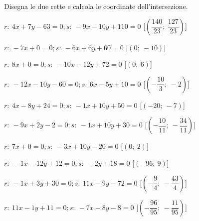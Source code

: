 \begin{esercizio}\label{ese:}
 Disegna le due rette e calcola le coordinate dell'intersezione.
 \begin{enumeratea}
  \item  \(r:~4 x + 7 y - 63 = 0; s:~-9 x - 10 y + 110 = 0\) \hfill 
   [\(\left(\dfrac{140}{23};~\dfrac{127}{23}\right)\)]
  \item  \(r:~-7 x + 0 = 0; s:~-6 x + 6 y + 60 = 0\) \hfill 
   [\(\left(0;~-10\right)\)]
  \item  \(r:~8 x + 0 = 0; s:~-10 x - 12 y + 72 = 0\) \hfill 
   [\(\left(0;~6\right)\)]
  \item  \(r:~-12 x - 10 y - 60 = 0; s:~6 x - 5 y + 10 = 0\) \hfill 
   [\(\left(-\dfrac{10}{3};~-2\right)\)]
  \item  \(r:~4 x - 8 y + 24 = 0; s:~-1 x + 10 y + 50 = 0\) \hfill 
   [\(\left(-20;~-7\right)\)]
  \item  \(r:~-9 x + 2 y - 2 = 0; s:~-1 x + 10 y + 30 = 0\) \hfill 
   [\(\left(-\dfrac{10}{11};~-\dfrac{34}{11}\right)\)]
  \item  \(r:~7 x + 0 = 0; s:~-3 x + 10 y - 20 = 0\) \hfill 
   [\(\left(0;~2\right)\)]
  \item  \(r:~-1 x - 12 y + 12 = 0; s:~-2 y + 18 = 0\) \hfill 
   [\(\left(-96;~9\right)\)]
  \item  \(r:~-1 x + 3 y + 30 = 0; s:~11 x - 9 y - 72 = 0\) \hfill 
   [\(\left(-\dfrac{9}{4};~-\dfrac{43}{4}\right)\)]
  \item  \(r:~11 x - 1 y + 11 = 0; s:~-7 x - 8 y - 8 = 0\) \hfill 
   [\(\left(-\dfrac{96}{95};~-\dfrac{11}{95}\right)\)]
 \end{enumeratea}
\end{esercizio}


